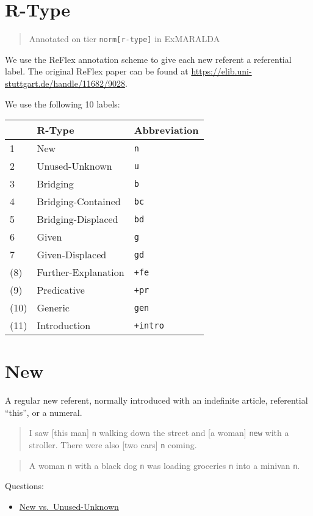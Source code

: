 \documentclass[
]{book}
\providecommand{\tightlist}{%
  \setlength{\itemsep}{0pt}\setlength{\parskip}{0pt}}
\begin{document}
\hypertarget{r-type}{%
\section{R-Type}\label{r-type}}

\begin{quote}
Annotated on tier \texttt{norm{[}r-type{]}} in ExMARALDA
\end{quote}

We use the ReFlex annotation scheme to give each new referent a referential label.
The original ReFlex paper can be found at \url{https://elib.uni-stuttgart.de/handle/11682/9028}.

We use the following 10 labels:

\begin{longtable}[]{@{}lll@{}}
\toprule
& R-Type & Abbreviation\tabularnewline
\midrule
\endhead
1 & New & \texttt{n}\tabularnewline
2 & Unused-Unknown & \texttt{u}\tabularnewline
3 & Bridging & \texttt{b}\tabularnewline
4 & Bridging-Contained & \texttt{bc}\tabularnewline
5 & Bridging-Displaced & \texttt{bd}\tabularnewline
6 & Given & \texttt{g}\tabularnewline
7 & Given-Displaced & \texttt{gd}\tabularnewline
(8) & Further-Explanation & \texttt{+fe}\tabularnewline
(9) & Predicative & \texttt{+pr}\tabularnewline
(10) & Generic & \texttt{gen}\tabularnewline
(11) & Introduction & \texttt{+intro}\tabularnewline
\bottomrule
\end{longtable}

\hypertarget{new}{%
\section{New}\label{new}}

A regular new referent, normally introduced with an indefinite article, referential ``this'', or a numeral.

\begin{quote}
I saw {[}this man{]} \texttt{n} walking down the street and {[}a woman{]} \texttt{new} with a stroller.
There were also {[}two cars{]} \texttt{n} coming.
\end{quote}

\begin{quote}
A woman \texttt{n} with a black dog \texttt{n} was loading groceries \texttt{n} into a minivan \texttt{n}.
\end{quote}

Questions:

\begin{itemize}
\tightlist
\item
  \protect\hyperlink{new-vs.-unused-unknown}{New vs.~Unused-Unknown}
\end{itemize}
\end{document}

